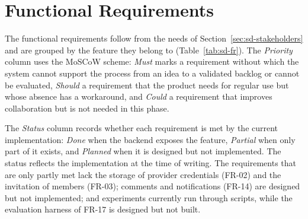 \section{Functional Requirements}
\label{sec:sd-fr}

The functional requirements follow from the needs of Section~\ref{sec:sd-stakeholders} and are grouped by the feature they belong to (Table~\ref{tab:sd-fr}). The \emph{Priority} column uses the MoSCoW scheme: \emph{Must} marks a requirement without which the system cannot support the process from an idea to a validated backlog or cannot be evaluated, \emph{Should} a requirement that the product needs for regular use but whose absence has a workaround, and \emph{Could} a requirement that improves collaboration but is not needed in this phase.

The \emph{Status} column records whether each requirement is met by the current implementation: \emph{Done} when the backend exposes the feature, \emph{Partial} when only part of it exists, and \emph{Planned} when it is designed but not implemented. The status reflects the implementation at the time of writing. The requirements that are only partly met lack the storage of provider credentials (FR-02) and the invitation of members (FR-03); comments and notifications (FR-14) are designed but not implemented; and experiments currently run through scripts, while the evaluation harness of FR-17 is designed but not built.

